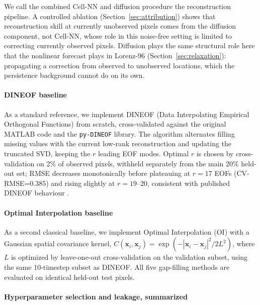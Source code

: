 \documentclass[final,5p,times,twocolumn,authoryear]{elsarticle}
\begin{document}
We call the combined Cell-NN and diffusion procedure the
reconstruction pipeline. A controlled ablation
(Section~\ref{sec:attribution}) shows that reconstruction skill at
currently unobserved pixels comes from the diffusion component, not
Cell-NN, whose role in this noise-free setting is limited to
correcting currently observed pixels. Diffusion plays the same
structural role here that the nonlinear forecast plays in Lorenz-96
(Section~\ref{sec:relaxation}): propagating a correction from
observed to unobserved locations, which the persistence background
cannot do on its own.

\paragraph{DINEOF baseline}

As a standard reference, we implement DINEOF (Data Interpolating
Empirical Orthogonal Functions) \citep{beckers2003dineof} from
scratch, cross-validated against the original MATLAB code and the
\texttt{py-DINEOF} library. The algorithm alternates filling missing
values with the current low-rank reconstruction and updating the
truncated SVD, keeping the $r$ leading EOF modes. Optimal $r$ is
chosen by cross-validation on 2\% of observed pixels, withheld
separately from the main 20\% held-out set; RMSE decreases
monotonically before plateauing at $r=17$ EOFs (CV-RMSE=0.385) and
rising slightly at $r=19$--$20$, consistent with published DINEOF
behaviour \citep{beckers2003dineof,alvera2005}.

\paragraph{Optimal Interpolation baseline}

As a second classical baseline, we implement Optimal Interpolation
(OI) \citep{bretherton1976} with a Gaussian spatial covariance
kernel, $C(\mathbf{x}_i, \mathbf{x}_j) = \exp(-|\mathbf{x}_i -
\mathbf{x}_j|^2 / 2L^2)$, where $L$ is optimized by leave-one-out
cross-validation on the validation subset, using the same
10-timestep subset as DINEOF. All five gap-filling methods are
evaluated on identical held-out test pixels.

\paragraph{Hyperparameter selection and leakage, summarized}
\end{document}
